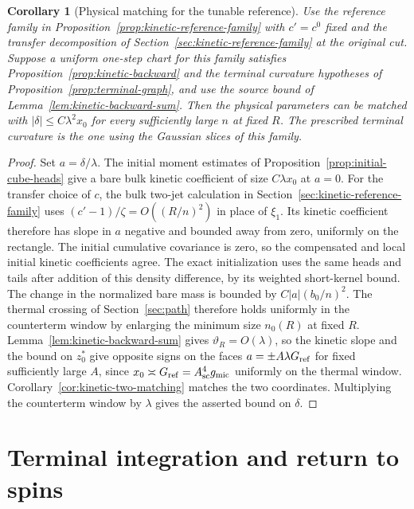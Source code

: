 \documentclass[11pt]{article}
\newtheorem{corollary}[theorem]{Corollary}
\theoremstyle{definition}
\begin{document}
\begin{corollary}[Physical matching for the tunable reference]
\label{cor:kinetic-reference-match}
Use the reference family in Proposition~\ref{prop:kinetic-reference-family} with \(c'=c^0\)
fixed and the transfer decomposition of
Section~\ref{sec:kinetic-reference-family} at the original cut.
Suppose a uniform one-step chart for this family satisfies
Proposition~\ref{prop:kinetic-backward} and the terminal
curvature hypotheses of Proposition~\ref{prop:terminal-graph},
and use the source bound of Lemma~\ref{lem:kinetic-backward-sum}.
Then the physical parameters can be matched with
\(|\delta|\le C\lambda^2 x_0\) for every sufficiently large
\(n\) at fixed \(R\). The prescribed terminal curvature is
the one using the Gaussian slices of this family.
\end{corollary}

\begin{proof}
Set \(a=\delta/\lambda\). The initial moment estimates of
Proposition~\ref{prop:initial-cube-heads} give a bare bulk
kinetic coefficient of size \(C\lambda x_0\) at \(a=0\).
For the transfer choice of \(c\), the bulk two-jet calculation in
Section~\ref{sec:kinetic-reference-family} uses
\((c'-1)/\zeta=O((R/n)^2)\) in place of \(\xi_1\). Its kinetic
coefficient therefore has slope in \(a\) negative and bounded away
from zero, uniformly on the rectangle. The initial
cumulative covariance is zero, so the compensated and
local initial kinetic coefficients agree. The exact
initialization uses the same heads and tails after addition
of this density difference, by its weighted short-kernel
bound. The change in the normalized bare mass is bounded by
\(C|a|(b_0/n)^2\). The thermal crossing of
Section~\ref{sec:path} therefore holds uniformly in the
counterterm window by enlarging the minimum size \(n_0(R)\)
at fixed \(R\). Lemma~\ref{lem:kinetic-backward-sum} gives
\(\vartheta_R=O(\lambda)\), so the kinetic slope and the
bound on \(z_0^*\) give opposite signs on the faces
\(a=\pm A\lambda G_{\rm ref}\) for fixed sufficiently large \(A\),
since \(x_0\asymp G_{\rm ref}=A_{\rm sc}^4g_{\mathrm{mic}}\)
uniformly on the thermal window.
Corollary~\ref{cor:kinetic-two-matching} matches the two
coordinates. Multiplying the counterterm window by
\(\lambda\) gives the asserted bound on \(\delta\).
\end{proof}

\section{Terminal integration and return to spins}\label{sec:terminal}
\end{document}
